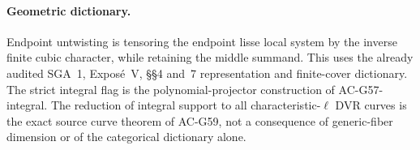 \paragraph{Geometric dictionary.}
Endpoint untwisting is tensoring the endpoint lisse
local system by the inverse finite cubic character,
while retaining the middle summand.  This uses the
already audited SGA~1, Expos\'e~V, \S\S4 and~7
representation and finite-cover dictionary.
The strict integral flag is the polynomial-projector
construction of AC-G57-integral.  The reduction of
integral support to all characteristic-\(\ell\)
DVR curves is the exact source curve theorem of
AC-G59, not a consequence of generic-fiber dimension
or of the categorical dictionary alone.
